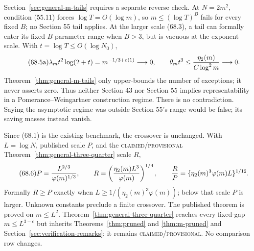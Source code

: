\documentclass[10pt,reqno]{amsart}
\theoremstyle{definition}
\newcommand{\1}{\mathbf 1}
\begin{document}
Section~\ref{sec:general-m-tails} requires a separate reverse check.  At
$N=2m^2$, condition (55.11) forces $\log T=O(\log m)$, so
$m\leq(\log T)^B$ fails for every fixed $B$; no Section 55 tail applies.  At
the larger scale (68.3), a tail can formally enter its fixed-$B$ parameter
range when $B>3$, but is vacuous at the exponent scale.  With
$t=\log T\leq O(\log N_0)$,
\begin{equation}\tag{68.5a}
 \lambda_mt^2\log(2+t)=m^{-1/3+o(1)}\longrightarrow0,
 \qquad
 \theta_mt^3\leq{\eta_2(m)\over C\log^2m}\longrightarrow0.
\end{equation}
Theorem~\ref{thm:general-m-tails} only upper-bounds the number of exceptions;
it never asserts zero.  Thus neither Section 43 nor Section 55 implies
representability in a Pomerance--Weingartner construction regime.  There is
no contradiction.  Saying the asymptotic regime was outside Section 55's
range would be false; its saving masses instead vanish.

Since (68.1) is the existing benchmark, the crossover is unchanged.  With
$L=\log N$, published scale $P$, and the
\textsc{claimed/provisional} Theorem~\ref{thm:general-three-quarter} scale
$R$,
\begin{equation}\tag{68.6}
 P={L^{2/3}\over\varphi(m)^{1/3}},\qquad
 R=\left({\eta_2(m)L^3\over\varphi(m)}\right)^{1/4},\qquad
 {R\over P}=\{\eta_2(m)^3\varphi(m)L\}^{1/12}.
\end{equation}
Formally $R\geq P$ exactly when
$L\geq1/(\eta_2(m)^3\varphi(m))$; below that scale $P$ is larger.  Unknown
constants preclude a finite crossover.  The published theorem is proved on
$m\leq L^2$.  Theorem~\ref{thm:general-three-quarter} reaches every fixed-gap
$m\leq L^{3-\epsilon}$ but inherits Theorems~\ref{thm:pruned} and
\ref{thm:m-pruned} and Section~\ref{sec:verification-remarks}; it remains
\textsc{claimed/provisional}.  No comparison row changes.
\end{document}
